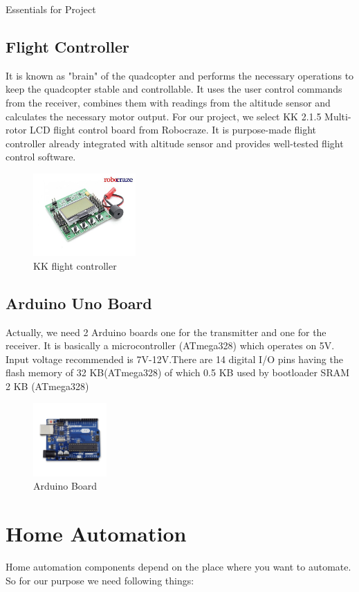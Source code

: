 \documentclass[12pt, oneside]{report}
\numberwithin{equation}{section}
\begin{document}
\begin{chapter}{Essentials for Project}
\subsection{Flight Controller}
It is known as "brain" of the quadcopter and performs the necessary operations to keep the quadcopter stable and controllable. It uses the user control commands from the receiver, combines them with readings from the altitude sensor and calculates the necessary motor output. For our project, we select KK 2.1.5 Multi-rotor LCD flight control board from Robocraze. It is purpose-made flight controller already integrated with altitude sensor and provides well-tested flight control software.\\
\begin{figure}[h]
\center
\includegraphics[width=0.35\textwidth]{flight}
\caption{KK flight controller}
\end{figure}


\subsection{Arduino Uno Board}
Actually, we need 2 Arduino boards one for the transmitter and one for the receiver. It is basically a microcontroller   (ATmega328) which operates on 5V. Input voltage recommended is 7V-12V.There are 14 digital I/O pins having the flash memory of 32 KB(ATmega328) of which 0.5 KB used by bootloader SRAM 2 KB (ATmega328)\\
\begin{figure}[h]
\center
\includegraphics[width=0.25\textwidth]{arduino}
\caption{Arduino Board}
\end{figure}

\section{Home Automation}
Home automation components depend on the place where you want to automate. So for our purpose we need following things:


\end{chapter}
\end{document}
